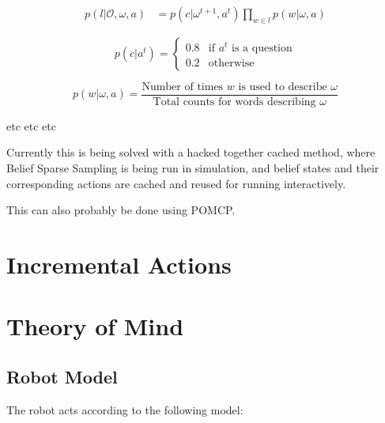 \documentclass{article}
\begin{document}
\begin{itemize}
\begin{align}
	p(l|\mathcal{O},\omega,a) &= 
p(c|\omega^{t+1}, a^t)\prod_{w \in l} p(w|\omega,a)
\end{align}


\begin{equation}
	p(c|a^t) = \begin{cases}
		0.8 & \text{if $a^t$ is a question} \\
		0.2 & \text{otherwise}
	\end{cases}
\end{equation}

$$p(w|\omega, a) = \frac{\text{Number of times $w$ is used to describe $\omega$}}{ \text{Total counts for words describing $\omega$}}$$


etc etc etc


\end{itemize}

Currently this is being solved with a hacked together cached method, where Belief Sparse Sampling is being run in simulation, and belief states and their corresponding actions are cached and reused for running interactively. 

This can also probably be done using POMCP. 

\section{Incremental Actions}

\section{Theory of Mind} 

\subsection{Robot Model}
The robot acts according to the following model: 
\end{document}

